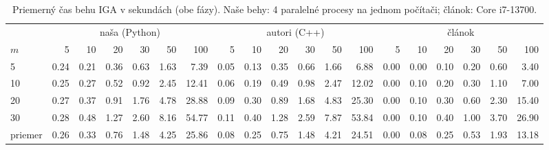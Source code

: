 \begin{table}[ht]
\centering
\scriptsize
\setlength{\tabcolsep}{3pt}
\caption{Priemerný čas behu IGA v sekundách (obe fázy). Naše behy: 4 paralelné procesy na jednom počítači; článok: Core i7-13700.}
\label{tab:time}
\begin{tabular}{l|rrrrrr|rrrrrr|rrrrrr}
\toprule
 & \multicolumn{6}{c}{naša (Python)} & \multicolumn{6}{c}{autori (C++)} & \multicolumn{6}{c}{článok} \\
$m$ & 5 & 10 & 20 & 30 & 50 & 100 & 5 & 10 & 20 & 30 & 50 & 100 & 5 & 10 & 20 & 30 & 50 & 100 \\
\midrule
5 & 0.24 & 0.21 & 0.36 & 0.63 & 1.63 & 7.39 & 0.05 & 0.13 & 0.35 & 0.66 & 1.66 & 6.88 & 0.00 & 0.00 & 0.10 & 0.20 & 0.60 & 3.40 \\
10 & 0.25 & 0.27 & 0.52 & 0.92 & 2.45 & 12.41 & 0.06 & 0.19 & 0.49 & 0.98 & 2.47 & 12.02 & 0.00 & 0.10 & 0.20 & 0.30 & 1.10 & 7.00 \\
20 & 0.27 & 0.37 & 0.91 & 1.76 & 4.78 & 28.88 & 0.09 & 0.30 & 0.89 & 1.68 & 4.83 & 25.30 & 0.00 & 0.10 & 0.30 & 0.60 & 2.30 & 15.40 \\
30 & 0.28 & 0.48 & 1.27 & 2.60 & 8.16 & 54.77 & 0.11 & 0.40 & 1.28 & 2.59 & 7.87 & 53.84 & 0.00 & 0.10 & 0.40 & 1.00 & 3.70 & 26.90 \\
\midrule
priemer & 0.26 & 0.33 & 0.76 & 1.48 & 4.25 & 25.86 & 0.08 & 0.25 & 0.75 & 1.48 & 4.21 & 24.51 & 0.00 & 0.08 & 0.25 & 0.53 & 1.93 & 13.18 \\
\bottomrule
\end{tabular}
\end{table}
